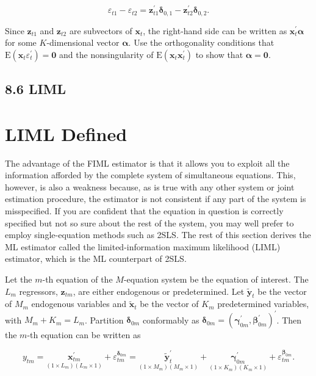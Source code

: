 \documentclass[10pt]{article}
\begin{document}
$$
\varepsilon_{t 1}-\varepsilon_{t 2}=\mathbf{z}_{t 1}^{\prime} \boldsymbol{\delta}_{0,1}-\mathbf{z}_{t 2}^{\prime} \boldsymbol{\delta}_{0,2} .
$$

Since $\mathbf{z}_{t 1}$ and $\mathbf{z}_{t 2}$ are subvectors of $\mathbf{x}_{t}$, the right-hand side can be written as $\mathbf{x}_{t}^{\prime} \boldsymbol{\alpha}$ for some $K$-dimensional vector $\boldsymbol{\alpha}$. Use the orthogonality conditions that $\mathrm{E}\left(\mathbf{x}_{t} \varepsilon_{t}^{\prime}\right)=\mathbf{0}$ and the nonsingularity of $\mathrm{E}\left(\mathbf{x}_{t} \mathbf{x}_{t}^{\prime}\right)$ to show that $\boldsymbol{\alpha}=\mathbf{0}$.

\subsection*{8.6 LIML}
\section*{LIML Defined}
The advantage of the FIML estimator is that it allows you to exploit all the information afforded by the complete system of simultaneous equations. This, however, is also a weakness because, as is true with any other system or joint estimation procedure, the estimator is not consistent if any part of the system is misspecified. If you are confident that the equation in question is correctly specified but not so sure about the rest of the system, you may well prefer to employ single-equation methods such as 2SLS. The rest of this section derives the ML estimator called the limited-information maximum likelihood (LIML) estimator, which is the ML counterpart of 2SLS.

Let the $m$-th equation of the $M$-equation system be the equation of interest. The $L_{m}$ regressors, $\mathbf{z}_{t m}$, are either endogenous or predetermined. Let $\tilde{\mathbf{y}}_{t}$ be the vector of $M_{m}$ endogenous variables and $\tilde{\mathbf{x}}_{t}$ be the vector of $K_{m}$ predetermined variables, with $M_{m}+K_{m}=L_{m}$. Partition $\boldsymbol{\delta}_{0 m}$ conformably as $\boldsymbol{\delta}_{0 m}=\left(\boldsymbol{\gamma}_{0 m}^{\prime}, \boldsymbol{\beta}_{0 m}^{\prime}\right)^{\prime}$. Then the $m$-th equation can be written as


\begin{equation*}
y_{t m}=\underset{\left(1 \times L_{m}\right)\left(L_{m} \times 1\right)}{\mathbf{x}_{t m}^{\prime}}+\varepsilon_{t m}^{\boldsymbol{\delta}_{0 m}}=\underset{\left(1 \times M_{m}\right)\left(M_{m} \times 1\right)}{\tilde{\mathbf{y}}_{t}^{\prime}}+\underset{\left(1 \times K_{m}\right)\left(K_{m} \times 1\right)}{\boldsymbol{\gamma}_{0 m}^{\prime}}+\varepsilon_{t m}^{\boldsymbol{\beta}_{0 m}} . \tag{8.6.1}
\end{equation*}
\end{document}
